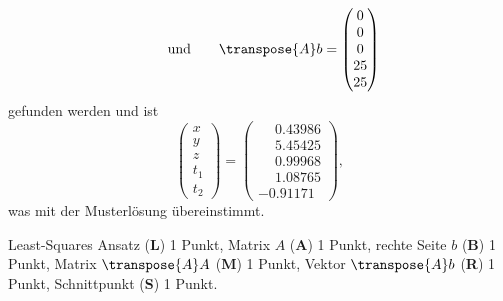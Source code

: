 \begin{diskussion}
\[\qquad\text{und}\qquad
\transpose{A}b=\begin{pmatrix}
    0 \\
    0 \\
    0 \\
   25 \\
   25
\end{pmatrix}
\]
gefunden werden und ist
\[
\begin{pmatrix}
x\\y\\z\\t_1\\t_2
\end{pmatrix}
=
\begin{pmatrix}
\phantom{-}0.43986\\
\phantom{-}5.45425\\
\phantom{-}0.99968\\
\phantom{-}1.08765\\
         - 0.91171
\end{pmatrix},
\]
was mit der Musterlösung übereinstimmt.
\end{diskussion}

\begin{bewertung}
Least-Squares Ansatz ({\bf L}) 1 Punkt,
Matrix $A$ ({\bf A}) 1 Punkt,
rechte Seite $b$ ({\bf B}) 1 Punkt,
Matrix $\transpose{A}A$ ({\bf M}) 1 Punkt,
Vektor $\transpose{A}b$ ({\bf R}) 1 Punkt,
Schnittpunkt ({\bf S}) 1 Punkt.
\end{bewertung}


